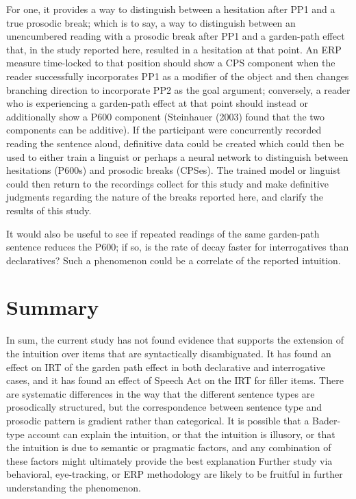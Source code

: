 \documentclass[12pt,oneside]{book}
\begin{document}
For one, it provides a way to distinguish between a hesitation after PP1 and a true prosodic break; which is to say, a way to distinguish between an unencumbered reading with a prosodic break after PP1 and a garden-path effect that, in the study reported here, resulted in a hesitation at that point. An ERP measure time-locked to that position should show a CPS component when the reader successfully incorporates PP1 as a modifier of the object and then changes branching direction to incorporate PP2 as the goal argument; conversely, a reader who is experiencing a garden-path effect at that point should instead or additionally show a P600 component (Steinhauer (2003) found that the two components can be additive). If the participant were concurrently recorded reading the sentence aloud, definitive data could be created which could then be used to either train a linguist or perhaps a neural network to distinguish between hesitations (P600s) and prosodic breaks (CPSes). The trained model or linguist could then return to the recordings collect for this study and make definitive judgments regarding the nature of the breaks reported here, and clarify the results of this study.

It would also be useful to see if repeated readings of the same garden-path sentence reduces the P600; if so, is the rate of decay faster for interrogatives than declaratives? Such a phenomenon could be a correlate of the reported intuition.

\hypertarget{summary}{%
\section{Summary}\label{summary}}

In sum, the current study has not found evidence that supports the extension of the intuition over items that are syntactically disambiguated. It has found an effect on IRT of the garden path effect in both declarative and interrogative cases, and it has found an effect of Speech Act on the IRT for filler items. There are systematic differences in the way that the different sentence types are prosodically structured, but the correspondence between sentence type and prosodic pattern is gradient rather than categorical. It is possible that a Bader-type account can explain the intuition, or that the intuition is illusory, or that the intuition is due to semantic or pragmatic factors, and any combination of these factors might ultimately provide the best explanation Further study via behavioral, eye-tracking, or ERP methodology are likely to be fruitful in further understanding the phenomenon.
\end{document}
